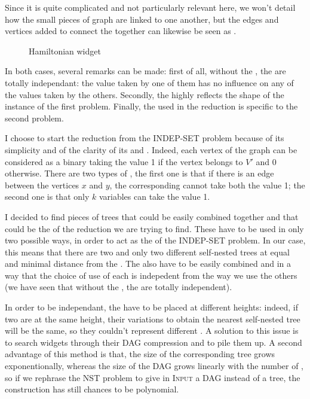 Since it is quite complicated and not particularly relevant here, we
won't detail how the small pieces of graph are linked to one another,
but the edges and vertices added to connect the \widgets together can
likewise be seen as \constraints.

\begin{figure}
  \centering
  
  \caption{Hamiltonian widget}
  \label{fig:hamilton}
\end{figure}

In both cases, several remarks can be made: first of all, without the
\constraints, the \widgets are totally independant: the value taken by
one of them has no influence on any of the values taken by the
others. Secondly, the \constraints highly reflects the shape of
the instance of the first problem. Finally, the \widget used in the
reduction is specific to the second problem.

I choose to start the reduction from the INDEP-SET problem because
of its simplicity and of the clarity of its \constraints and
\variables. Indeed, each vertex of the graph can be considered as
a binary \variable taking the value 1 if the vertex belongs to $V'$
and 0 otherwise. There are two types of \constraints, the first one is that
if there is an edge between the vertices $x$ and $y$, the
corresponding \variables cannot take both the value 1; the second one is
that only $k$ variables can take the value 1.

I decided to find pieces of trees that could be easily combined
together and that could be the \widgets of the reduction we are trying
to find. These \widgets have to be used in only two possible ways, in
order to act as the \variables of the INDEP-SET problem. In our case,
this means that there are two and only two different self-nested trees
at equal and minimal distance from the \widget. The \widgets also have
to be easily combined and in a way that the choice of use of each
\widget is indepedent from the way we use the others (we have seen
that without the \constraints, the \widgets are totally independent). 

In order to be independant, the \widgets have to be placed at
different heights: indeed, if two \widgets are at the same height,
their variations to obtain the nearest self-nested tree will be the
same, so they couldn't represent different \variables. A solution to
this issue is to search widgets through their DAG compression and to
pile them up. A second advantage of this method is that, the size of
the corresponding tree grows exponentionally, whereas the size of the
DAG grows linearly with the number of \widgets, so if we rephrase the
NST problem to give in \textsc{Input} a DAG instead of a tree, the
construction has still chances to be polynomial.

